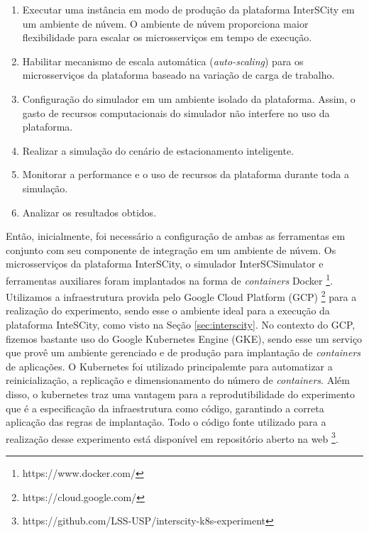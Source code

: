 \begin{enumerate}
    \item Executar uma instância em modo de produção da plataforma InterSCity em um ambiente de núvem. O ambiente de núvem proporciona maior flexibilidade para escalar os microsserviços em tempo
        de execução.

    \item Habilitar mecanismo de escala automática (\textit{auto-scaling}) para os microsserviços da plataforma baseado na variação de carga de trabalho.

    \item Configuração do simulador em um ambiente isolado da plataforma. Assim, o gasto de recursos computacionais do simulador não interfere no uso da plataforma.

    \item Realizar a simulação do cenário de estacionamento inteligente.

    \item Monitorar a performance e o uso de recursos da plataforma durante toda a simulação.

    \item Analizar os resultados obtidos.
\end{enumerate}

Então, inicialmente, foi necessário a configuração de ambas as ferramentas em conjunto com seu componente de integração em um ambiente de núvem.
Os microsserviços da plataforma InterSCity, o simulador InterSCSimulator e ferramentas auxiliares foram implantados na forma de \textit{containers} Docker \footnote{https://www.docker.com/}.
Utilizamos a infraestrutura provida pelo Google Cloud Platform (GCP) \footnote{https://cloud.google.com/} para a realização do experimento, sendo esse o ambiente ideal para a execução da plataforma
InteSCity, como visto na Seção \ref{sec:interscity}.
No contexto do GCP, fizemos bastante uso do Google Kubernetes Engine (GKE), sendo esse um serviço que provê um ambiente gerenciado e de produção para implantação de \textit{containers} de
aplicações.
O Kubernetes foi utilizado principalemte para automatizar a reinicialização, a replicação e dimensionamento do número de \textit{containers}.
Além disso, o kubernetes traz uma vantagem para a reprodutibilidade do experimento que é a especificação da infraestrutura como código, garantindo a correta aplicação das regras de implantação.
Todo o código fonte utilizado para a realização desse experimento está disponível em repositório aberto na web \footnote{https://github.com/LSS-USP/interscity-k8s-experiment}.

